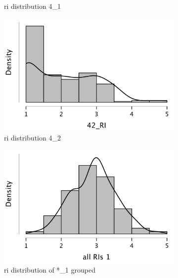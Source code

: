 \documentclass[
  a4paper,  %
  twoside,  %
  bibliography=totoc,
  headsepline,
  cleardoublepage=empty,
  parskip=half,
  draft=false
]{scrbook}
\begin{document}
\begin{figure}[h]
\begin{subfigure}{0.3\textwidth}
    \caption{\gls{ri} distribution 4\_1}
    \label{fig:RI41}
  \end{subfigure}
  \begin{subfigure}{0.3\textwidth}
    \includegraphics[width=\linewidth]{graphics/images/statistics/RIs/42_RI.png}
    \caption{\gls{ri} distribution 4\_2}
    \label{fig:RI42}
  \end{subfigure}
  \begin{subfigure}{0.4\textwidth}
    \includegraphics[width=\linewidth]{graphics/images/statistics/RIs/RI1_all.png}
    \caption{\gls{ri} distribution of *\_1 grouped}
    \label{fig:grouped-RI1}
  \end{subfigure}
  \begin{subfigure}{0.4\textwidth}

\end{subfigure}
\end{figure}
\end{document}
